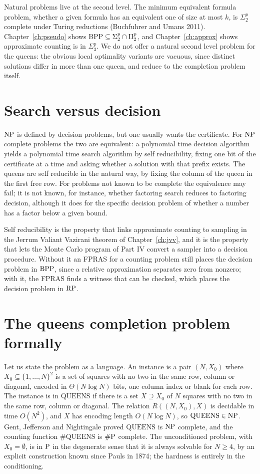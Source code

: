 Natural problems live at the second level. The minimum equivalent formula problem, whether a given formula has an equivalent one of size at most $k$, is $\Sigma_2^p$ complete under Turing reductions (Buchfuhrer and Umans 2011). Chapter~\ref{ch:pseudo} shows $\mathrm{BPP} \subseteq \Sigma_2^p \cap \Pi_2^p$, and Chapter~\ref{ch:approx} shows approximate counting is in $\Sigma_3^p$. We do not offer a natural second level problem for the queens: the obvious local optimality variants are vacuous, since distinct solutions differ in more than one queen, and reduce to the completion problem itself.

\section{Search versus decision}

$\mathrm{NP}$ is defined by decision problems, but one usually wants the certificate. For $\mathrm{NP}$ complete problems the two are equivalent: a polynomial time decision algorithm yields a polynomial time search algorithm by self reducibility, fixing one bit of the certificate at a time and asking whether a solution with that prefix exists. The queens are self reducible in the natural way, by fixing the column of the queen in the first free row. For problems not known to be complete the equivalence may fail; it is not known, for instance, whether factoring search reduces to factoring decision, although it does for the specific decision problem of whether a number has a factor below a given bound.

Self reducibility is the property that links approximate counting to sampling in the Jerrum Valiant Vazirani theorem of Chapter~\ref{ch:jvv}, and it is the property that lets the Monte Carlo program of Part IV convert a sampler into a decision procedure. Without it an FPRAS for a counting problem still places the decision problem in $\mathrm{BPP}$, since a relative approximation separates zero from nonzero; with it, the FPRAS finds a witness that can be checked, which places the decision problem in $\mathrm{RP}$.

\section{The queens completion problem formally}

Let us state the problem as a language. An instance is a pair $(N, X_0)$ where $X_0 \subseteq \{1, \dots, N\}^2$ is a set of squares with no two in the same row, column or diagonal, encoded in $\Theta(N \log N)$ bits, one column index or blank for each row. The instance is in $\mathrm{QUEENS}$ if there is a set $X \supseteq X_0$ of $N$ squares with no two in the same row, column or diagonal. The relation $R((N, X_0), X)$ is decidable in time $O(N^2)$, and $X$ has encoding length $O(N \log N)$, so $\mathrm{QUEENS} \in \mathrm{NP}$. Gent, Jefferson and Nightingale proved $\mathrm{QUEENS}$ is $\mathrm{NP}$ complete, and the counting function $\#\mathrm{QUEENS}$ is $\#\mathrm{P}$ complete. The unconditioned problem, with $X_0 = \emptyset$, is in $\mathrm{P}$ in the degenerate sense that it is always solvable for $N \ge 4$, by an explicit construction known since Pauls in 1874; the hardness is entirely in the conditioning.
